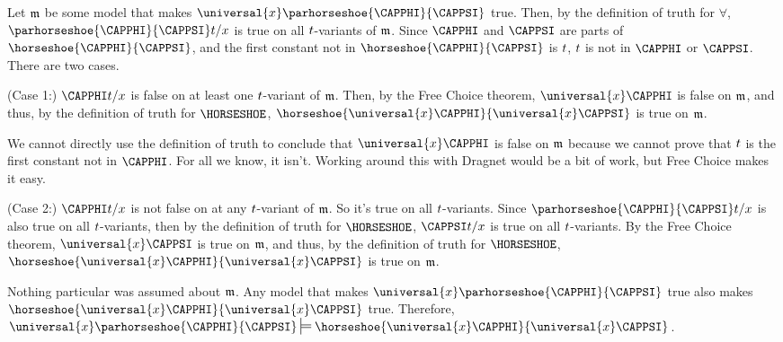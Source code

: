 \begin{PROOF}
	Let $\mathfrak{m}$ be some model that makes $\universal{\variable{x}}\parhorseshoe{\CAPPHI}{\CAPPSI}$ true.
	Then, by the definition of truth for $\forall$, $\parhorseshoe{\CAPPHI}{\CAPPSI}\variable{t}/\variable{x}$ is true on all $t$-variants of $\mathfrak{m}$.
	Since $\CAPPHI$ and $\CAPPSI$ are parts of $\horseshoe{\CAPPHI}{\CAPPSI}$, and the first constant not in $\horseshoe{\CAPPHI}{\CAPPSI}$ is $t$, $t$ is not in $\CAPPHI$ or $\CAPPSI$.
	There are two cases.

	(Case 1:) $\CAPPHI\variable{t}/\variable{x}$ is false on at least one $t$-variant of $\mathfrak{m}$.
	Then, by the Free Choice theorem, $\universal{\variable{x}}\CAPPHI$ is false on $\mathfrak{m}$, and thus, by the definition of truth for $\HORSESHOE$, $\horseshoe{\universal{\variable{x}}\CAPPHI}{\universal{\variable{x}}\CAPPSI}$ is true on $\mathfrak{m}$.

	\begin{commentary}
		We cannot directly use the definition of truth to conclude that $\universal{\variable{x}}\CAPPHI$ is false on $\mathfrak{m}$ because we cannot prove that $t$ is the first constant not in $\CAPPHI$.
		For all we know, it isn't.
		Working around this with Dragnet would be a bit of work, but Free Choice makes it easy.
	\end{commentary}

	(Case 2:) $\CAPPHI\variable{t}/\variable{x}$ is not false on at any $t$-variant of $\mathfrak{m}$.
	So it's true on all $t$-variants.
	Since $\parhorseshoe{\CAPPHI}{\CAPPSI}\variable{t}/\variable{x}$ is also true on all $t$-variants, then by the definition of truth for $\HORSESHOE$, $\CAPPSI\variable{t}/\variable{x}$ is true on all $t$-variants.
	By the Free Choice theorem, $\universal{\variable{x}}\CAPPSI$ is true on $\mathfrak{m}$, and thus, by the definition of truth for $\HORSESHOE$, $\horseshoe{\universal{\variable{x}}\CAPPHI}{\universal{\variable{x}}\CAPPSI}$ is true on $\mathfrak{m}$.

	Nothing particular was assumed about $\mathfrak{m}$.
	Any model that makes $\universal{\variable{x}}\parhorseshoe{\CAPPHI}{\CAPPSI}$ true also makes $\horseshoe{\universal{\variable{x}}\CAPPHI}{\universal{\variable{x}}\CAPPSI}$ true.
	Therefore, $\universal{\variable{x}}\parhorseshoe{\CAPPHI}{\CAPPSI}\sdtstile{}{}\horseshoe{\universal{\variable{x}}\CAPPHI}{\universal{\variable{x}}\CAPPSI}$.	
\end{PROOF}

